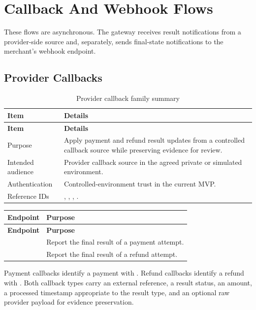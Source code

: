 \section{Callback And Webhook Flows}

These flows are asynchronous. The gateway receives result notifications from a
provider-side source and, separately, sends final-state notifications to the
merchant's webhook endpoint.

\subsection{Provider Callbacks}

\begin{longtable}{@{}L{0.25\textwidth}L{0.65\textwidth}@{}}
\caption{Provider callback family summary}\\
\toprule
\textbf{Item} & \textbf{Details} \\
\midrule
\endfirsthead
\toprule
\textbf{Item} & \textbf{Details} \\
\midrule
\endhead
Purpose & Apply payment and refund result updates from a controlled callback
source while preserving evidence for review. \\
\bodyrowrule
Intended audience & Provider callback source in the agreed private or
simulated environment. \\
\bodyrowrule
Authentication & Controlled-environment trust in the current MVP. \\
\bodyrowrule
Reference IDs & , , , . \\
\bottomrule
\end{longtable}

\begin{longtable}{@{}L{0.31\textwidth}L{0.59\textwidth}@{}}
\toprule
\textbf{Endpoint} & \textbf{Purpose} \\
\midrule
\endfirsthead
\toprule
\textbf{Endpoint} & \textbf{Purpose} \\
\midrule
\endhead
{} & Report the final result of a
payment attempt. \\
\bodyrowrule
{} & Report the final result of a refund
attempt. \\
\bottomrule
\end{longtable}

Payment callbacks identify a payment with . Refund
callbacks identify a refund with . Both callback
types carry an external reference, a result status, an amount, a processed
timestamp appropriate to the result type, and an optional raw provider payload
for evidence preservation.

